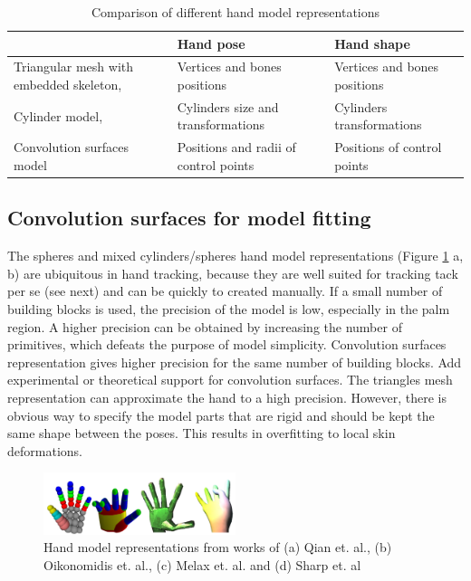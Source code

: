 \begin{table}[!h] 
	\centering
	\begin{tabular}{|p{2.5cm}|p{2.5cm}|p{2.5cm}|}
	\hline
 	& Hand pose  & Hand shape  \\
	\hline
	Triangular mesh with embedded skeleton, \cite{taylor2014user} & Vertices and bones positions & Vertices and bones positions	 \\
	\hline
	Cylinder model, \cite{tagliasacchi2015robust} & Cylinders size and transformations & Cylinders transformations	 \\
	\hline
	Convolution surfaces model & Positions and radii of control points & Positions of control points \\
	\hline
	\end{tabular}
	\vspace{1em}
	\caption{Comparison of different hand model representations}
	\label{table:representation_dependent_components}
\end{table}

\subsection{Convolution surfaces for model fitting}
The spheres and mixed cylinders/spheres hand model representations (Figure \ref{fig:hand_model_representations} a, b) are ubiquitous in hand tracking, because they are well suited for tracking tack per se (see next) and can be quickly to created manually. If a small number of  building blocks is used, the precision of the model is low, especially in the palm region. A higher precision can be obtained by increasing the number of primitives, which defeats the purpose of model simplicity. Convolution surfaces representation gives higher precision for the same number of building blocks. \textcolor{mygray}{Add experimental or theoretical support for convolution surfaces.}
The triangles mesh representation can approximate the hand to a high precision. However, there is obvious way to specify the model parts that are rigid and should be kept the same shape between the poses. This results in overfitting to local skin deformations. 

\begin{figure}[h!] 
	\centering
	\hspace{-2em}
	\includegraphics[width=0.5\textwidth]{fig/hand_model_representations}
	\caption {Hand model representations from works of (a) Qian et. al., (b)  Oikonomidis et. al., (c) Melax et. al.  and (d) Sharp et. al}
	\label{fig:hand_model_representations}
\end{figure}

